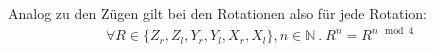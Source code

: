\documentclass[12pt,a4paper, usenames, dvipsnames]{article}
\newcommand{\Gtwo}{\ensuremath{G_{2\times 2\times 2}}}
\begin{document}
Analog zu den Zügen gilt bei den Rotationen also für jede Rotation: 
\begin{align*}
\forall R \in \{{Z_r}, {Z_l}, {Y_r}, {Y_l}, {X_r}, {X_l} \}, n \in \mathbb{N} \ . \ R^n=R^{n \mod 4}
\end{align*}

%
%
%
%
%
%
%
%
%
%
%
%
%
%
%
%
%
%
%
%











\end{document}
